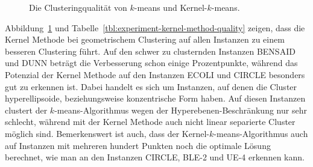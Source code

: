 \begin{figure}[h!]
	\centering
\caption{Die Clusteringqualität von $k$-means und Kernel-$k$-means.}
\label{fig:experiment-kernel-method-quality}
\end{figure}
Abbildung~\ref{fig:experiment-kernel-method-quality} und Tabelle~\ref{tbl:experiment-kernel-method-quality} zeigen, dass
die Kernel Methode bei geometrischem Clustering auf allen Instanzen zu einem besseren Clustering führt. Auf den schwer zu
clusternden Instanzen BENSAID und DUNN beträgt die Verbesserung schon einige Prozentpunkte, während das Potenzial der Kernel
Methode auf den Instanzen ECOLI und CIRCLE besonders gut zu erkennen ist. Dabei handelt es sich um Instanzen, auf denen die Cluster
hyperellipsoide, beziehungsweise konzentrische Form haben. Auf diesen Instanzen clustert der $k$-means-Algorithmus wegen der
Hyperebenen-Beschränkung nur sehr schlecht, während mit der Kernel Methode auch nicht linear separierte Cluster möglich sind.
Bemerkenswert ist auch, dass der Kernel-$k$-means-Algorithmus auch auf Instanzen mit mehreren hundert Punkten noch die optimale
Lösung berechnet, wie man an den Instanzen CIRCLE, BLE-2 und UE-4 erkennen kann.
